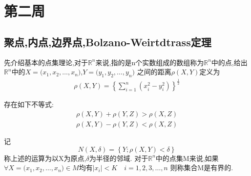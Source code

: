 \section{第二周}
\subsection{聚点,内点,边界点,Bolzano-Weirtdtrass定理}
先介绍基本的点集理论,对于\(\mathbb{R}^n\)来说,指的是n个实数组成的数组称为\(\mathbb{R}^n\)中的点,给出\(\mathbb{R}^n\)中的\(X = \bigl(x_1,x_2,\dots,x_n \bigr)\),\(Y= \bigl(y_1,y_2,\dots,y_n\bigr)\)
之间的距离\(\rho(X,Y)\)定义为
\begin{align*}
    \rho(X,Y) = \left\{\sum_{i=1}^{n}(x_i^2 - y_i^2)\right\}^{\frac{1}{2}}
\end{align*}
\begin{Theorem}
    存在如下不等式:
    \begin{align*}
        \rho(X, Y) + \rho(Y,Z) > \rho(X,Z) \\ 
        \rho(X,Y) - \rho(Y,Z) < \rho(X,Z)
    \end{align*}
\end{Theorem}
记\[N(X, \delta)=\left\{Y; \rho(X,Y) < \delta \right\}\]
称上述的运算为以X为原点,\(\delta\)为半径的邻域.
对于\(\mathbb{R}^n\)中的点集M来说,如果\(\forall X = \bigl(x_1,x_2 ,\dots,x_n\bigr) \in M \)均有\(|x_i| < K \quad i=1,2,3,\dots ,n\)
则称集合M是有界的.
